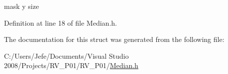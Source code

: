 mask y size 



Definition at line 18 of file Median.\+h.



The documentation for this struct was generated from the following file\+:\begin{DoxyCompactItemize}
\item 
C\+:/\+Users/\+Jefe/\+Documents/\+Visual Studio 2008/\+Projects/\+R\+V\+\_\+\+P01/\+R\+V\+\_\+\+P01/\hyperlink{_median_8h}{Median.\+h}\end{DoxyCompactItemize}
